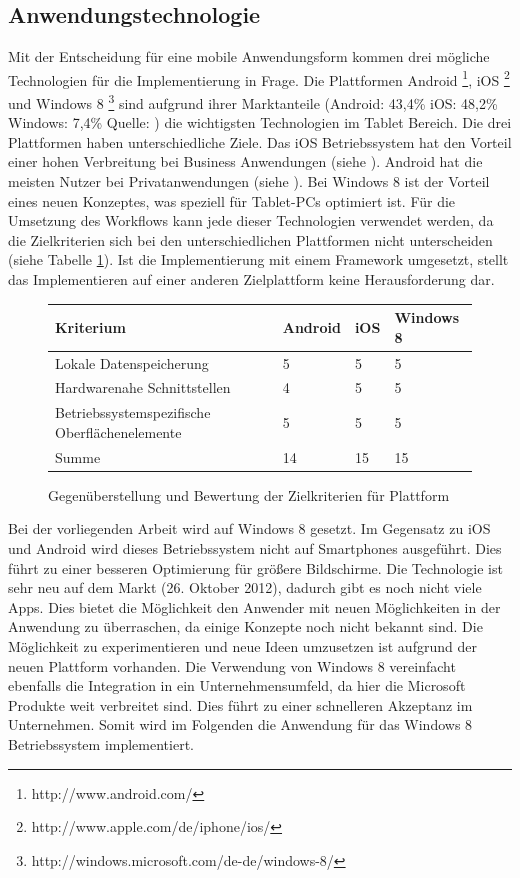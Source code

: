 \subsection{Anwendungstechnologie}
Mit der Entscheidung für eine mobile Anwendungsform kommen drei mögliche Technologien für die Implementierung in Frage. Die Plattformen Android \footnote{http://www.android.com/}, iOS \footnote{http://www.apple.com/de/iphone/ios/} und Windows 8 \footnote{http://windows.microsoft.com/de-de/windows-8/} sind aufgrund ihrer Marktanteile (Android: 43,4\% iOS: 48,2\% Windows: 7,4\% Quelle: \cite{bib:marktanteilBS} ) die wichtigsten Technologien im Tablet Bereich. Die drei Plattformen haben unterschiedliche Ziele. Das iOS Betriebssystem hat den Vorteil einer hohen Verbreitung bei Business Anwendungen (siehe \cite[S.5]{bib:mobileMarketing2}). Android hat die meisten Nutzer bei Privatanwendungen (siehe \cite{bib:marktanteilMBS}). Bei Windows 8 ist der Vorteil eines neuen Konzeptes, was speziell für Tablet-PCs optimiert ist. Für die Umsetzung des Workflows kann jede dieser Technologien verwendet werden, da die Zielkriterien sich bei den unterschiedlichen Plattformen nicht unterscheiden (siehe Tabelle \ref{decisionTechnologie}). Ist die Implementierung mit einem Framework umgesetzt, stellt das Implementieren auf einer anderen Zielplattform keine Herausforderung dar. \par 
\begin{figure}
\begin{tabular}[H]{| p{5.4cm} | p{2.5cm} | p{2.5cm} | p{2.5cm} |}
\toprule[2pt] \rowcolor{dunkelgrau}
\hline
  Kriterium & Android & iOS & Windows 8 \\
  \hline
  Lokale Datenspeicherung & 5 & 5 & 5
   \\
  \hline
  Hardwarenahe Schnittstellen &4  &5  & 5  \\
  \hline
    Betriebssystemspezifische Oberflächenelemente & 5 & 5 & 5 \\
  \hline
    Summe & 14 & 15 & 15 \\
  \hline
\bottomrule[2pt]
\end{tabular}
\caption{Gegenüberstellung und Bewertung der Zielkriterien für Plattform}
\label{decisionTechnologie}
\end{figure}

Bei der vorliegenden Arbeit wird auf Windows 8 gesetzt. Im Gegensatz zu iOS und Android wird dieses Betriebssystem nicht auf Smartphones ausgeführt. Dies führt zu einer besseren Optimierung für größere Bildschirme. Die Technologie ist sehr neu auf dem Markt (26. Oktober 2012), dadurch gibt es noch nicht viele Apps. Dies bietet die Möglichkeit den Anwender mit neuen Möglichkeiten in der Anwendung zu überraschen, da einige Konzepte noch nicht bekannt sind. Die Möglichkeit zu experimentieren und neue Ideen umzusetzen ist aufgrund der neuen Plattform vorhanden.  Die Verwendung von Windows 8 vereinfacht ebenfalls die Integration in ein Unternehmensumfeld, da hier die Microsoft Produkte weit verbreitet sind. Dies führt zu einer schnelleren Akzeptanz im Unternehmen. Somit wird im Folgenden die Anwendung für das Windows 8 Betriebssystem implementiert.
        

